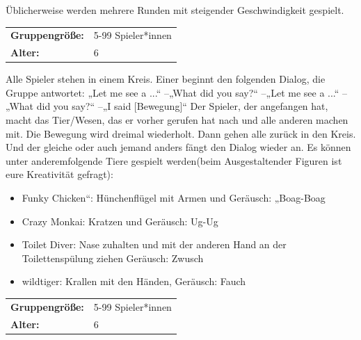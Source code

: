 Üblicherweise werden mehrere Runden mit steigender Geschwindigkeit gespielt.\\



\begin{table}[H]
\begin{tabular}{>{\bfseries}lp{8cm}}
   Gruppengröße:   & 5-99 Spieler*innen\\
    Alter: & 6 \\
\end{tabular}
\end{table} 
Alle Spieler stehen in einem Kreis. Einer beginnt den folgenden Dialog, die Gruppe antwortet: „Let me see a ...“ –„What did you say?“ –„Let me see a ...“ –„What did you say?“ –„I said [Bewegung]“ Der Spieler, der angefangen hat, macht das Tier/Wesen, das er vorher gerufen hat nach und alle anderen machen mit. Die Bewegung wird dreimal wiederholt. Dann gehen alle zurück in den Kreis. Und der gleiche oder auch jemand anders fängt den Dialog wieder an. Es können unter anderemfolgende Tiere gespielt werden(beim Ausgestaltender Figuren ist eure Kreativität gefragt):
    \begin{itemize}
        \item Funky Chicken“: Hünchenflügel mit Armen und Geräusch: „Boag-Boag
        \item Crazy Monkai: Kratzen und Geräusch: Ug-Ug
        \item Toilet Diver: Nase zuhalten und mit der anderen Hand an der Toilettenspülung ziehen Geräusch: Zwusch
        \item wildtiger: Krallen mit den Händen, Geräusch: Fauch
    \end{itemize}


\begin{table}[H]
\begin{tabular}{>{\bfseries}lp{8cm}}
   Gruppengröße:   & 5-99 Spieler*innen\\
    Alter: & 6 \\
\end{tabular}
\end{table} 

